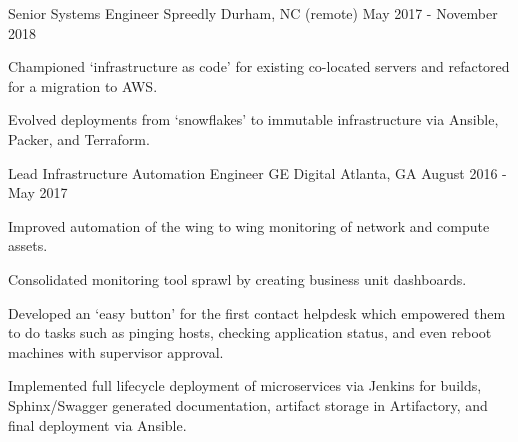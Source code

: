 \begin{cventries}
  \cventry
    {Senior Systems Engineer} %
    {Spreedly} %
    {Durham, NC (remote)} %
    {May 2017 - November 2018} %
    {
      \begin{cvitems} %
        \item {Championed `infrastructure as code' for existing co-located servers and refactored for a migration to AWS.}
        \item {Evolved deployments from `snowflakes' to immutable infrastructure via Ansible, Packer, and Terraform.}
      \end{cvitems}
    }

  \cventry
    {Lead Infrastructure Automation Engineer} %
    {GE Digital} %
    {Atlanta, GA} %
    {August 2016 - May 2017} %
    {
      \begin{cvitems} %
        \item {Improved automation of the wing to wing monitoring of network and compute assets.}
        \item {Consolidated monitoring tool sprawl by creating business unit dashboards.}
        \item {Developed an `easy button' for the first contact helpdesk which empowered them to do tasks such as pinging hosts, checking application status, and even reboot machines with supervisor approval.}
        \item {Implemented full lifecycle deployment of microservices via Jenkins for builds, Sphinx/Swagger generated documentation, artifact storage in Artifactory, and final deployment via Ansible.}
      \end{cvitems}
    }


\end{cventries}
